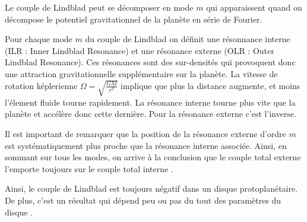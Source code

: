 


Le couple de Lindblad peut se décomposer en mode $m$ qui apparaissent quand on décompose le potentiel gravitationnel de la planète en série de Fourier. 

Pour chaque mode $m$ du couple de Lindblad on définit une résonnance interne (ILR : Inner Lindblad Resonance) et une résonance externe (OLR : Outer Lindblad Resonance). Ces résonances sont des sur-densités qui provoquent donc une attraction gravitationnelle supplémentaire sur la planète. La vitesse de rotation képlerienne $\Omega = \sqrt{\frac{GM}{r^3}}$ implique que plus la distance augmente, et moins l'élement fluide tourne rapidement. La résonance interne tourne plus vite que la planète et accélère donc cette dernière. Pour la résonance externe c'est l'inverse. 

Il est important de remarquer que la position de la résonance externe d'ordre $m$ est systématiquement plus proche que la résonance interne associée. Ainsi, en sommant sur tous les modes, on arrive à la conclusion que le couple total externe l'emporte toujours sur le couple total interne \citep{ward1997protoplanet}. 

Ainsi, le couple de Lindblad est toujours négatif dans un disque protoplanétaire. De plus, c'est un résultat qui dépend peu ou pas du tout des paramètres du disque \citep{ward1997protoplanet}.

